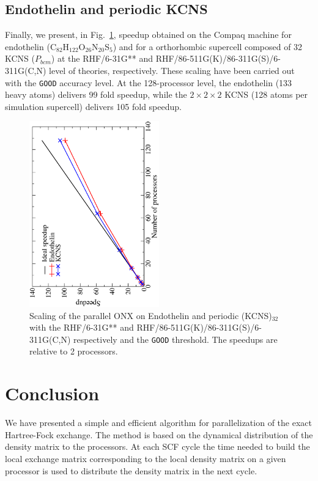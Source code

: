 \documentclass[prl,twocolumn,twocolumngrid,superbib]{revtex4}
\begin{document}
\subsection{Endothelin and periodic KCNS}
Finally, we present, in Fig.~\ref{fig:Endothelin_KCNS}, 
speedup obtained on the Compaq machine for 
endothelin (C$_{82}$H$_{122}$O$_{26}$N$_{20}$S$_5$) and
for a orthorhombic supercell composed of 32 KCNS ($P_{bcm}$)
at the RHF/6-31G** and RHF/86-511G(K)/86-311G(S)/6-311G(C,N) 
level of theories, respectively.
These scaling have been carried out with the {\tt GOOD} accuracy level.
At the 128-processor level, the endothelin (133 heavy atoms) delivers 99 fold
speedup, while the $2\times 2\times 2$ KCNS (128 atoms per simulation supercell)
delivers 105 fold speedup. 

\begin{figure}[p]
  \caption{\protect
    Scaling of the parallel ONX on Endothelin and periodic (KCNS)$_{32}$ with 
    the RHF/6-31G** and RHF/86-511G(K)/86-311G(S)/6-311G(C,N) 
    respectively and the {\tt GOOD} threshold.
    The speedups are relative to 2 processors.
  }\label{fig:Endothelin_KCNS}
  \includegraphics[angle=-90,width=0.5\textwidth]{Endothelin_KCNS}
\end{figure}

\section{Conclusion}\label{Sec:Conc}

 We have presented a simple and efficient algorithm for 
 parallelization of the exact Hartree-Fock
 exchange. The method is based on the dynamical distribution 
 of the density matrix to the processors. At each SCF cycle the
 time needed to build the local exchange matrix corresponding
 to the local density matrix on a given processor is used to
 distribute the density matrix in the next cycle. 
\end{document}
